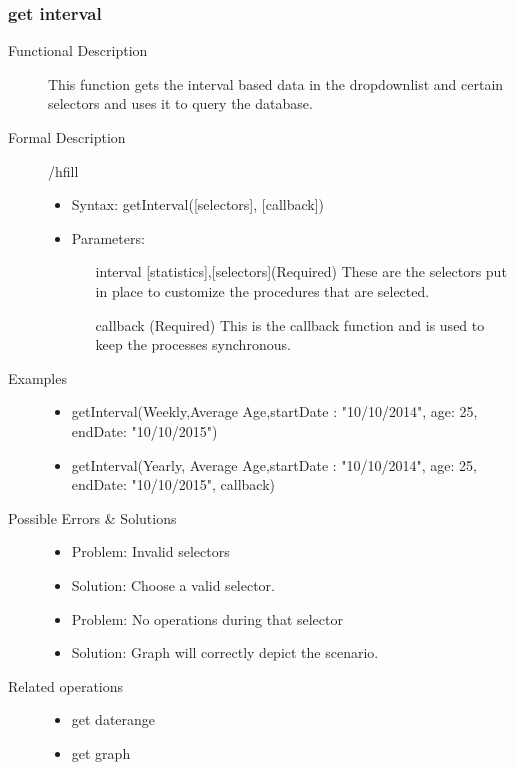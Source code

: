\documentclass[a4paper]{article}
\begin{document}
\subsubsection{get interval}
\begin{description}
\item[Functional Description] This function gets the interval based data in the dropdownlist and certain selectors and uses it to query the database.
\item[Formal Description]/hfill
\begin{itemize}
	\item Syntax: getInterval([selectors], [callback])\\
	\item Parameters:
		\begin{itemize}
			\item [interval][statistics],[selectors](Required) These are the selectors put in place to customize the procedures that are selected.
			\item [callback](Required) This is the callback function and is used to keep the processes synchronous.
		\end{itemize}
\end{itemize}
\item[Examples]\hfill
\begin{itemize}
	\item getInterval(Weekly,Average Age,{startDate : "10/10/2014", age: 25, endDate: "10/10/2015"})
	\item getInterval(Yearly, Average Age,{startDate : "10/10/2014", age: 25, endDate: "10/10/2015"}, callback)
\end{itemize}
\item[Possible Errors \& Solutions]
\begin{itemize}
	\item Problem: Invalid selectors
	\item Solution: Choose a valid selector.
	\item Problem: No operations during that selector
	\item Solution: Graph will correctly depict the scenario.
\end{itemize}
\item[Related operations] \hfill
\begin{itemize}
	\item get daterange
	\item get graph
\end{itemize}
\end{description}
\end{document}
